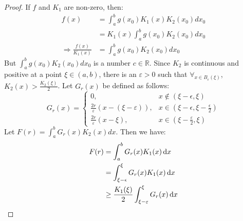 \documentclass[crop=false,class=book,oneside]{standalone}
\begin{document}
            \begin{proof}
                If $f$ and $K_{1}$ are non-zero, then:
                \begin{subequations}
                    \begin{align}
                        f(x)&=\int_{a}^{b}g(x_{0})K_{1}(x)
                             K_{2}(x_{0})dx_{0}\\
                        &=K_{1}(x)\int_{a}^{b}g(x_{0})
                             K_{2}(x_{0})dx_{0}\\
                        \Longrightarrow
                        \frac{f(x)}{K_{1}(x)}
                        &=\int_{a}^{b}g(x_{0})K_{2}(x_{0})dx_{0}
                    \end{align}
                \end{subequations}
                But $\int_{a}^{b}g(x_{0})K_{2}(x_{0})dx_{0}$ is a
                number $c\in\mathbb{R}$. Since $K_{2}$ is continuous
                and positive at a point $\xi\in(a,b)$, there is an
                $\varepsilon>0$ such that
                $\forall_{x\in B_{\varepsilon}(\xi)}$,
                $K_{2}(x)>\frac{K_{2}(\xi)}{2}$.
                Let $G_{r}(x)$ be defined as follows:
                \begin{equation}
                    G_{r}(x)=
                        \begin{cases}
                            0,&x\notin(\xi-\epsilon,\xi)\\
                            \frac{2r}{\varepsilon}(x-(\xi-\varepsilon)),
                            &x\in(\xi-\epsilon,\xi-\frac{\epsilon}{2})\\
                            \frac{2r}{\varepsilon}(x-\xi),&
                            x\in(\xi-\frac{\varepsilon}{2},\xi)
                        \end{cases}
                \end{equation}
                Let $F(r)=\int_{a}^{b}G_{r}(x)K_{2}(x)dx$.
                Then we have:
                \begin{subequations}
                    \begin{align}
                        F(r)&=\int_{a}^{b}G_{r}(x)K_{1}(x)\diff{x}\\
                            &=\int_{\xi-\epsilon}^{\xi}G_{r}(x)K_{1}(x)\diff{x}\\
                        &\geq\frac{K_{1}(\xi)}{2}
                            \int_{\xi-\varepsilon}^{\xi}G_{r}(x)\diff{x}\\

\end{align}
\end{subequations}
\end{proof}
\end{document}
